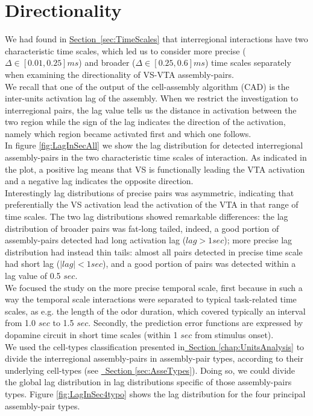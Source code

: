 \section{Directionality} 
\label{sec:Directionality}
We had found in \hyperref[sec:TimeScales]{Section~\ref*{sec:TimeScales}} that interregional interactions have two characteristic time scales, which led us to consider more precise ($\Delta \in [0.01,0.25] ms$) and broader ($\Delta \in [0.25,0.6] ms$) time scales separately when examining the directionality of VS-VTA assembly-pairs.\\We recall that one of the output of the cell-assembly algorithm (CAD) is the inter-units activation lag of the assembly. When we restrict the investigation to interregional pairs, the lag value tells us the distance in activation between the two region while the sign of the lag indicates the direction of the activation, namely which region became activated first and which one follows.\\In figure \ref{fig:LagInSecAll} we show the lag distribution for detected interregional assembly-pairs in the two characteristic time scales of interaction. As indicated in the plot, a positive lag means that VS is functionally leading the VTA activation and a negative lag indicates the opposite direction.\\Interestingly lag distributions of precise pairs was asymmetric, indicating that preferentially the VS activation lead the activation of the VTA in that range of time scales. The two lag distributions showed remarkable differences: the lag distribution of broader pairs was fat-long tailed, indeed, a good portion of assembly-pairs detected had long activation lag ($lag > 1 sec$); more precise lag distribution had instead thin tails: almost all pairs detected in precise time scale had short lag ($|lag| < 1 sec$), and a good portion of pairs was detected within a lag value of 0.5 $sec$.\\
We focused the study on the more precise temporal scale, first because in such a way the temporal scale interactions were separated to typical task-related time scales, as e.g. the length of the odor duration, which covered typically an interval from 1.0 $sec$ to 1.5 $sec$. Secondly, the prediction error functions are expressed by dopamine circuit in short time scales (within 1 $sec$ from stimulus onset).\\ We used the cell-types classification presented in\hyperref[chap:UnitsAnalysis]{~Section \ref*{chap:UnitsAnalysis}} to divide the interregional assembly-pairs in assembly-pair types, according to their underlying cell-types (see \hyperref[sec:AsseTypes]{~Section \ref*{sec:AsseTypes}}). Doing so, we could divide the global lag distribution in lag distributions specific of those assembly-pairs types. Figure \ref{fig:LagInSec4typo} shows the lag distribution for the four principal assembly-pair types.\\

